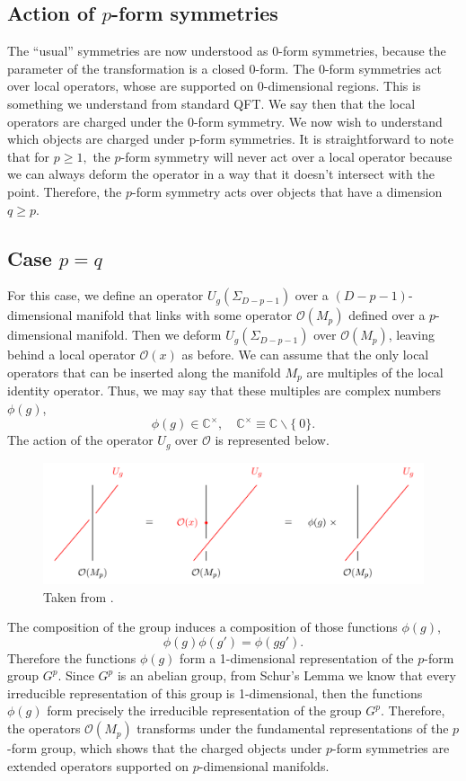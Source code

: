 \documentclass{article}
\begin{document}
\subsection{Action of $p$-form symmetries}
The “usual” symmetries are now understood as 0-form symmetries, because the parameter of the transformation is a closed 0-form. The 0-form symmetries act over local operators, whose are supported on 0-dimensional regions. This is something we understand from standard QFT. We say then that the local operators are charged under the 0-form symmetry. We now wish to understand which objects are charged under p-form symmetries. It is straightforward to note that for $p\geq1,$ the $p$-form symmetry will never act over a local operator because we can always deform the operator in a way that it doesn’t intersect with the point. Therefore, the $p$-form symmetry acts over objects that have a dimension $q\geq p$.

\subsection*{Case $p=q$}
For this case, we define an operator $U_g(\Sigma_{D-p-1})$ over a $(D-p-1)$-dimensional manifold that links with some operator  $\mathcal{O}(M_p)$ defined over a $p$-dimensional manifold. Then we deform $U_g(\Sigma_{D-p-1})$  over $\mathcal{O}(M_p)$, leaving behind a local operator $\mathcal{O}(x)$ as before. We can assume that the only local operators that can be inserted along the manifold $M_p$ are multiples of the local identity operator. Thus, we may say that these multiples are complex numbers $\phi(g)$,  
$$
\phi(g)\in \mathbb{C}^{\times},\quad \mathbb{C}^{\times}\equiv \mathbb{C}\backslash\{\ 0 \}.
$$
The action of the operator $U_g$ over $\mathcal{O}$ is represented below. 
\begin{figure}[H]
	\centering
	\includegraphics[scale=0.4]{figures/linking2.png}
	\caption{Taken from \cite{Bhardwaj}.} 
\end{figure}
The composition of the group induces a composition of those functions $\phi(g)$, 
\begin{equation}
	\phi(g)\phi(g')=\phi(gg').
\end{equation}
Therefore the functions $\phi(g)$ form a 1-dimensional representation of the $p$-form group $G^p$.  Since $G^p$ is an abelian group, from Schur’s Lemma we know that every irreducible representation of this group is 1-dimensional, then the functions $\phi(g)$ form precisely the irreducible representation of the group $G^p$. Therefore, the operators $\mathcal{O}(M_p)$ transforms under the fundamental representations of the $p$-form group, which shows that the charged objects under $p$-form symmetries are extended operators supported on $p$-dimensional manifolds. 
\end{document}
